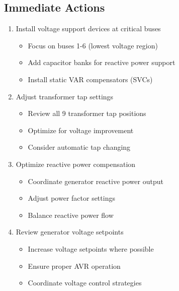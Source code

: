\documentclass[11pt]{article}
\begin{document}
\subsection{Immediate Actions}
\begin{enumerate}
    \item Install voltage support devices at critical buses
    \begin{itemize}
        \item Focus on buses 1-6 (lowest voltage region)
        \item Add capacitor banks for reactive power support
        \item Install static VAR compensators (SVCs)
    \end{itemize}
    
    \item Adjust transformer tap settings
    \begin{itemize}
        \item Review all 9 transformer tap positions
        \item Optimize for voltage improvement
        \item Consider automatic tap changing
    \end{itemize}
    
    \item Optimize reactive power compensation
    \begin{itemize}
        \item Coordinate generator reactive power output
        \item Adjust power factor settings
        \item Balance reactive power flow
    \end{itemize}
    
    \item Review generator voltage setpoints
    \begin{itemize}
        \item Increase voltage setpoints where possible
        \item Ensure proper AVR operation
        \item Coordinate voltage control strategies
    \end{itemize}
\end{enumerate}
\end{document}
